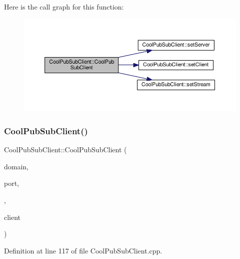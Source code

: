 Here is the call graph for this function\+:\nopagebreak
\begin{figure}[H]
\begin{center}
\leavevmode
\includegraphics[width=350pt]{class_cool_pub_sub_client_a103e7286407babde84d63bb735c4e4b6_cgraph}
\end{center}
\end{figure}
\mbox{\label{class_cool_pub_sub_client_a2aea0a9487dc15b9db1caf0f069eb877}} 
\subsubsection{\texorpdfstring{Cool\+Pub\+Sub\+Client()}{CoolPubSubClient()}\hspace{0.1cm}{\footnotesize\ttfamily [13/14]}}
{\footnotesize\ttfamily Cool\+Pub\+Sub\+Client\+::\+Cool\+Pub\+Sub\+Client (\begin{DoxyParamCaption}\item[{const char $\ast$}]{domain,  }\item[{uint16\+\_\+t}]{port,  }\item[{\hyperlink{class_cool_pub_sub_client_a021ec75e9fbaf658370b8005ccfddc14}{M\+Q\+T\+T\+\_\+\+C\+A\+L\+L\+B\+A\+C\+K\+\_\+\+S\+I\+G\+N\+A\+T\+U\+RE}}]{,  }\item[{Client \&}]{client }\end{DoxyParamCaption})}



Definition at line 117 of file Cool\+Pub\+Sub\+Client.\+cpp.

